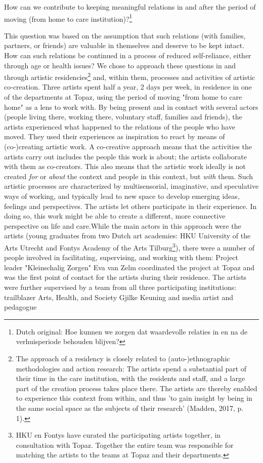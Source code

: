 \documentclass[authordate, empirical]{jote-new-article}
\begin{document}
	How can we contribute to keeping meaningful relations in and after the period of moving (from home to care institution)?\footnote{Dutch original: Hoe kunnen we zorgen dat waardevolle relaties in en na de verhuisperiode behouden blijven? }







	This question was based on the assumption that such relations (with families, partners, or friends) are valuable in themselves and deserve to be kept intact. How can such relations be continued in a process of reduced self-reliance, either through age or health issues? We chose to approach these questions in and through artistic residencies\footnote{The approach of a residency is closely related to \linebreak (auto-)ethnographic methodologies and action research: The artists spend a substantial part of their time in the care institution, with the residents and staff, and a large part of the creation process takes place there. The artists are thereby enabled to experience this context from within, and thus 'to gain insight by being in the same social space as the subjects of their research' (Madden, 2017, p. 1).} and, within them, processes and activities of artistic co-creation. Three artists spent half a year, 2 days per week, in residence in one of the departments at Topaz, using the period of moving "from home to care home" as a lens to work with. By being present and in contact with several actors (people living there, working there, voluntary staff, families and friends), the artists experienced what happened to the relations of the people who have moved. They used their experiences as inspiration to react by means of (co-)creating artistic work. A co-creative approach means that the activities the artists carry out includes the people this work is about; the artists collaborate with them as co-creators. This also means that the artistic work ideally is not created \emph{for} or \emph{about }the context and people in this context, but \emph{with} them. Such artistic processes are characterized by multisensorial, imaginative, and speculative ways of working, and typically lead to new space to develop emerging ideas, feelings and perspectives. The artists let others participate in their experience. In doing so, this work might be able to create a different, more connective perspective on life and care.While the main actors in this approach were the artists (young graduates from two Dutch art academies: HKU University of the Arts Utrecht and Fontys Academy of the Arts Tilburg\footnote{ HKU en Fontys have curated the participating artists together, in consultation with Topaz. Together the entire team was responsible for matching the artists to the teams at Topaz and their departments.}), there were a number of people involved in facilitating, supervising, and working with them: Project leader "Kleinschalig Zorgen" Eva van Zelm coordinated the project at Topaz and was the first point of contact for the artists during their residence. The artists were further supervised by a team from all three participating institutions: trailblazer Arts, Health, and Society Gjilke Keuning and media artist and pedagogue 
\end{document}
